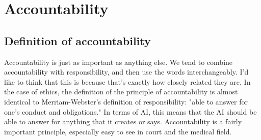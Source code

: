\section{Accountability}
\subsection{Definition of accountability}
Accountability is just as important as anything else. We tend to combine accountability with
responsibility, and then use the words interchangeably. I'd like to think that this is because
that's exactly how closely related they are. In the case of ethics, the definition of the principle
of accountability is almost identical to Merriam-Webster's definition of responsibility: "able to 
answer for one's conduct and obligations." In terms of AI, this means that the AI should be
able to answer for anything that it creates or says. Accountability is a fairly important principle,
especially easy to see in court and the medical field.

